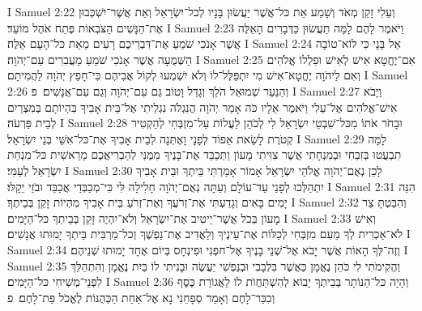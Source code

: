I Samuel 2:22	וְעֵלִי זָקֵן מְאֹד וְשָׁמַע אֵת כּל־אֲשֶׁר יַעֲשׂוּן בָּנָיו לְכל־יִשְׂרָאֵל וְאֵת אֲשֶׁר־יִשְׁכְּבוּן אֶת־הַנָּשִׁים הַצֹּבְאוֹת פֶּתַח אֹהֶל מוֹעֵד׃
I Samuel 2:23	וַיֹּאמֶר לָהֶם לָמָּה תַעֲשׂוּן כַּדְּבָרִים הָאֵלֶּה אֲשֶׁר אָנֹכִי שֹׁמֵעַ אֶת־דִּבְרֵיכֶם רָעִים מֵאֵת כּל־הָעָם אֵלֶּה׃
I Samuel 2:24	אַל בָּנָי כִּי לוֹא־טוֹבָה הַשְּׁמֻעָה אֲשֶׁר אָנֹכִי שֹׁמֵעַ מַעֲבִרִים עַם־יְהֹוָה׃
I Samuel 2:25	אִם־יֶחֱטָא אִישׁ לְאִישׁ וּפִלְלוֹ אֱלֹהִים וְאִם לַיהֹוָה יֶחֱטָא־אִישׁ מִי יִתְפַּלֶּל־לוֹ וְלֹא יִשְׁמְעוּ לְקוֹל אֲבִיהֶם כִּי־חָפֵץ יְהֹוָה לַהֲמִיתָם׃
I Samuel 2:26	וְהַנַּעַר שְׁמוּאֵל הֹלֵךְ וְגָדֵל וָטוֹב גַּם עִם־יְהֹוָה וְגַם עִם־אֲנָשִׁים׃ {פ}
I Samuel 2:27	וַיָּבֹא אִישׁ־אֱלֹהִים אֶל־עֵלִי וַיֹּאמֶר אֵלָיו כֹּה אָמַר יְהֹוָה הֲנִגְלֹה נִגְלֵיתִי אֶל־בֵּית אָבִיךָ בִּהְיוֹתָם בְּמִצְרַיִם לְבֵית פַּרְעֹה׃
I Samuel 2:28	וּבָחֹר אֹתוֹ מִכּל־שִׁבְטֵי יִשְׂרָאֵל לִי לְכֹהֵן לַעֲלוֹת עַל־מִזְבְּחִי לְהַקְטִיר קְטֹרֶת לָשֵׂאת אֵפוֹד לְפָנָי וָאֶתְּנָה לְבֵית אָבִיךָ אֶת־כּל־אִשֵּׁי בְּנֵי יִשְׂרָאֵל׃
I Samuel 2:29	לָמָּה תִבְעֲטוּ בְּזִבְחִי וּבְמִנְחָתִי אֲשֶׁר צִוִּיתִי מָעוֹן וַתְּכַבֵּד אֶת־בָּנֶיךָ מִמֶּנִּי לְהַבְרִיאֲכֶם מֵרֵאשִׁית כּל־מִנְחַת יִשְׂרָאֵל לְעַמִּי׃
I Samuel 2:30	לָכֵן נְאֻם־יְהֹוָה אֱלֹהֵי יִשְׂרָאֵל אָמוֹר אָמַרְתִּי בֵּיתְךָ וּבֵית אָבִיךָ יִתְהַלְּכוּ לְפָנַי עַד־עוֹלָם וְעַתָּה נְאֻם־יְהֹוָה חָלִילָה לִּי כִּי־מְכַבְּדַי אֲכַבֵּד וּבֹזַי יֵקָלּוּ׃
I Samuel 2:31	הִנֵּה יָמִים בָּאִים וְגָדַעְתִּי אֶת־זְרֹעֲךָ וְאֶת־זְרֹעַ בֵּית אָבִיךָ מִהְיוֹת זָקֵן בְּבֵיתֶךָ׃
I Samuel 2:32	וְהִבַּטְתָּ צַר מָעוֹן בְּכֹל אֲשֶׁר־יֵיטִיב אֶת־יִשְׂרָאֵל וְלֹא־יִהְיֶה זָקֵן בְּבֵיתְךָ כּל־הַיָּמִים׃
I Samuel 2:33	וְאִישׁ לֹא־אַכְרִית לְךָ מֵעִם מִזְבְּחִי לְכַלּוֹת אֶת־עֵינֶיךָ וְלַאֲדִיב אֶת־נַפְשֶׁךָ וְכל־מַרְבִּית בֵּיתְךָ יָמוּתוּ אֲנָשִׁים׃
I Samuel 2:34	וְזֶה־לְּךָ הָאוֹת אֲשֶׁר יָבֹא אֶל־שְׁנֵי בָנֶיךָ אֶל־חפְנִי וּפִינְחָס בְּיוֹם אֶחָד יָמוּתוּ שְׁנֵיהֶם׃
I Samuel 2:35	וַהֲקִימֹתִי לִי כֹּהֵן נֶאֱמָן כַּאֲשֶׁר בִּלְבָבִי וּבְנַפְשִׁי יַעֲשֶׂה וּבָנִיתִי לוֹ בַּיִת נֶאֱמָן וְהִתְהַלֵּךְ לִפְנֵי־מְשִׁיחִי כּל־הַיָּמִים׃
I Samuel 2:36	וְהָיָה כּל־הַנּוֹתָר בְּבֵיתְךָ יָבוֹא לְהִשְׁתַּחֲוֺת לוֹ לַאֲגוֹרַת כֶּסֶף וְכִכַּר־לָחֶם וְאָמַר סְפָחֵנִי נָא אֶל־אַחַת הַכְּהֻנּוֹת לֶאֱכֹל פַּת־לָחֶם׃ {פ}
